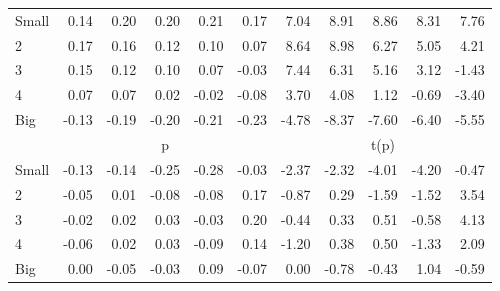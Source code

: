 \begin{table}[!ht]
\begin{tabular}{lrrrrrrrrrr}
    \\
      \cmidrule(r){2-6} \cmidrule(r){7-11}

    Small   & 0.14  & 0.20  & 0.20  & 0.21  & 0.17  & 7.04  & 8.91  & 8.86  & 8.31  & 7.76  \\
         2  & 0.17  & 0.16  & 0.12  & 0.10  & 0.07  & 8.64  & 8.98  & 6.27  & 5.05  & 4.21  \\
         3  & 0.15  & 0.12  & 0.10  & 0.07  & -0.03  & 7.44  & 6.31  & 5.16  & 3.12  & -1.43  \\
         4  & 0.07  & 0.07  & 0.02  & -0.02  & -0.08  & 3.70  & 4.08  & 1.12  & -0.69  & -3.40  \\
    Big     & -0.13  & -0.19  & -0.20  & -0.21  & -0.23  & -4.78  & -8.37  & -7.60  & -6.40  & -5.55  \\

  
    
      & \multicolumn{5}{c}{p} & \multicolumn{5}{c}{t(p)}
    
    \\
      \cmidrule(r){2-6} \cmidrule(r){7-11}

    Small   & -0.13  & -0.14  & -0.25  & -0.28  & -0.03  & -2.37  & -2.32  & -4.01  & -4.20  & -0.47  \\
         2  & -0.05  & 0.01  & -0.08  & -0.08  & 0.17  & -0.87  & 0.29  & -1.59  & -1.52  & 3.54  \\
         3  & -0.02  & 0.02  & 0.03  & -0.03  & 0.20  & -0.44  & 0.33  & 0.51  & -0.58  & 4.13  \\
         4  & -0.06  & 0.02  & 0.03  & -0.09  & 0.14  & -1.20  & 0.38  & 0.50  & -1.33  & 2.09  \\
    Big     & 0.00  & -0.05  & -0.03  & 0.09  & -0.07  & 0.00  & -0.78  & -0.43  & 1.04  & -0.59  \\

  

  \bottomrule
\end{tabular}
\label{tbl:25_Size_Beta_B2016}
\end{table}